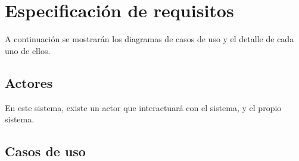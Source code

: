 \section{Especificación de requisitos}

A continuación se mostrarán los diagramas de casos de uso y el detalle de cada uno de ellos.


\subsection{Actores}

En este sistema, existe un actor que interactuará con el sistema, y el propio sistema.


\subsection{Casos de uso}

